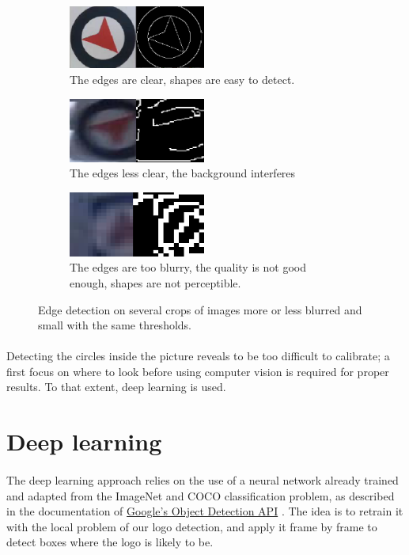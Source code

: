 \documentclass[12pt]{article}%
\begin{document}
\captionsetup[subfigure]{labelformat=simple, labelsep=period}
\begin{figure}
	\centering
	\begin{subfigure}[t]{5cm}
		\centering
		\includegraphics[width=4.5cm]{images/edgeDetect1.png}
		\caption{The edges are clear, shapes are easy to detect.}
	\end{subfigure}
	\begin{subfigure}[t]{5cm}
		\centering
		\includegraphics[width=4.5cm]{images/edgeDetect2.png}
		\caption{The edges less clear, the background interferes}
	\end{subfigure}
	\begin{subfigure}[t]{5cm}
		\centering
		\includegraphics[width=4.5cm]{images/edgeDetect3.png}
		\caption{The edges are too blurry, the quality is not good enough, shapes are not perceptible.}
	\end{subfigure}
	\caption{Edge detection on several crops of images more or less blurred and small with the same thresholds.}\label{fig:edgeDetection}
\end{figure}

\paragraph{}
Detecting the circles inside the picture reveals to be too difficult to calibrate; a first focus on where to look before using computer vision is required for proper results. To that extent, deep learning is used.

\section{Deep learning}

\paragraph{}
The deep learning approach relies on the use of a neural network already trained and adapted from the ImageNet and COCO classification problem, as described in the documentation of \href{https://github.com/tensorflow/models/tree/master/research/object_detection}{Google's Object Detection API} \cite{googleAPI}.
The idea is to retrain it with the local problem of our logo detection, and apply it frame by frame to detect boxes where the logo is likely to be.
\end{document}
